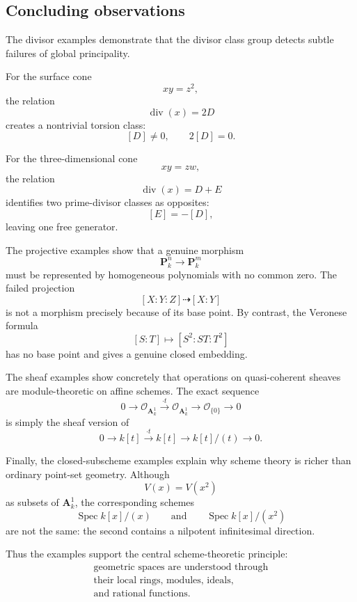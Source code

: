 \subsection{Concluding observations}

The divisor examples demonstrate that the divisor class group detects subtle failures of global principality.

For the surface cone
\[
xy=z^2,
\]
the relation
\[
\operatorname{div}(x)=2D
\]
creates a nontrivial torsion class:
\[
[D]\neq0,
\qquad
2[D]=0.
\]

For the three-dimensional cone
\[
xy=zw,
\]
the relation
\[
\operatorname{div}(x)=D+E
\]
identifies two prime-divisor classes as opposites:
\[
[E]=-[D],
\]
leaving one free generator.

The projective examples show that a genuine morphism
\[
\mathbf P^n_k\longrightarrow\mathbf P^m_k
\]
must be represented by homogeneous polynomials with no common zero. The failed projection
\[
[X:Y:Z]\dashrightarrow[X:Y]
\]
is not a morphism precisely because of its base point. By contrast, the Veronese formula
\[
[S:T]\longmapsto[S^2:ST:T^2]
\]
has no base point and gives a genuine closed embedding.

The sheaf examples show concretely that operations on quasi-coherent sheaves are module-theoretic on affine schemes. The exact sequence
\[
0
\longrightarrow
\mathcal O_{\mathbf A^1_k}
\xrightarrow{\cdot t}
\mathcal O_{\mathbf A^1_k}
\longrightarrow
\mathcal O_{\{0\}}
\longrightarrow
0
\]
is simply the sheaf version of
\[
0
\longrightarrow
k[t]
\xrightarrow{\cdot t}
k[t]
\longrightarrow
k[t]/(t)
\longrightarrow
0.
\]

Finally, the closed-subscheme examples explain why scheme theory is richer than ordinary point-set geometry. Although
\[
V(x)=V(x^2)
\]
as subsets of \(\mathbf A^1_k\), the corresponding schemes
\[
\operatorname{Spec}k[x]/(x)
\qquad\text{and}\qquad
\operatorname{Spec}k[x]/(x^2)
\]
are not the same: the second contains a nilpotent infinitesimal direction.

Thus the examples support the central scheme-theoretic principle:
\[
\boxed{\begin{gathered}
\text{geometric spaces are understood through}\\
\text{their local rings, modules, ideals,}\\
\text{and rational functions.}
\end{gathered}}
\]

%
%

